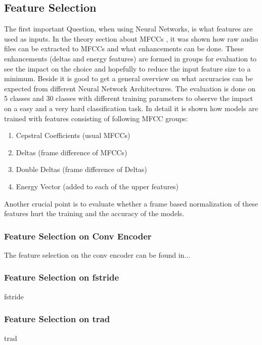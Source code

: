 
\subsection{Feature Selection}
The first important Question, when using Neural Networks, is what features are used as inputs.
In the theory section about MFCCs , it was shown how raw audio files can be extracted to MFCCs and what enhancements can be done.
These enhancements (deltas and energy features) are formed in groups for evaluation to see the impact on the choice and hopefully to reduce the input feature size to a minimum.
Beside it is good to get a general overview on what accuracies can be expected from different Neural Network Architectures.
The evaluation is done on 5 classes and 30 classes with different training parameters to observe the impact on a easy and a very hard classification task.
In detail it is shown how models are trained with features consisting of following MFCC groups:
\begin{enumerate}
    \item Cepstral Coefficients (usual MFCCs)
    \item Deltas (frame difference of MFCCs)
    \item Double Deltas (frame difference of Deltas)
    \item Energy Vector (added to each of the upper features)
\end{enumerate}
Another crucial point is to evaluate whether a frame based normalization of these features hurt the training and the accuracy of the models.

\subsubsection{Feature Selection on Conv Encoder}
The feature selection on the conv encoder can be found in...
% 
% 
% 




\subsubsection{Feature Selection on fstride}
fstride


\subsubsection{Feature Selection on trad}
trad


